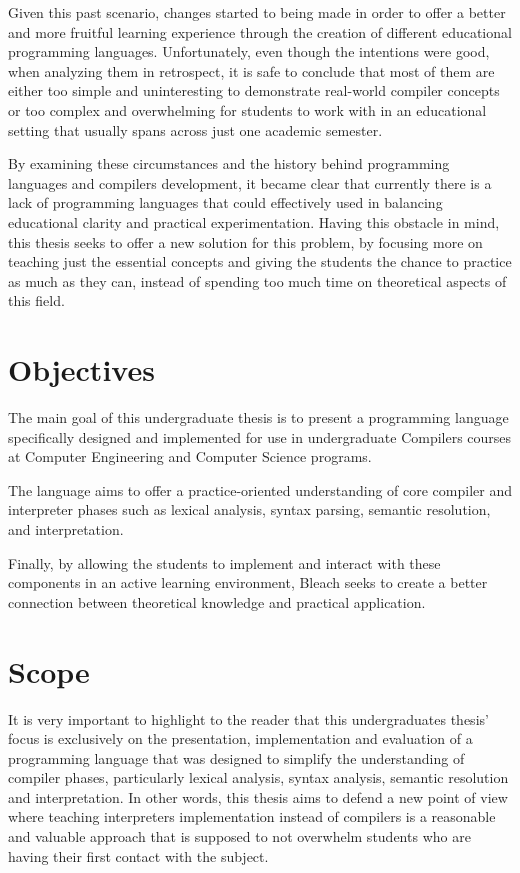 Given this past scenario, changes started to being made in order to offer a better and more fruitful learning experience through the creation of different educational programming languages. Unfortunately, even though the intentions were good, when analyzing them in retrospect, it is safe to conclude that most of them are either too simple and uninteresting to demonstrate real-world compiler concepts or too complex and overwhelming for students to work with in an educational setting that usually spans across just one academic semester.

By examining these circumstances and the history behind programming languages and compilers development, it became clear that currently there is a lack of programming languages that could effectively used in balancing educational clarity and practical experimentation. Having this obstacle in mind, this thesis seeks to offer a new solution for this problem, by focusing more on teaching just the essential concepts and giving the students the chance to practice as much as they can, instead of spending too much time on theoretical aspects of this field.

\section{Objectives}
The main goal of this undergraduate thesis is to present a programming language specifically designed and implemented for use in undergraduate Compilers courses at Computer Engineering and Computer Science programs.

The language aims to offer a practice-oriented understanding of core compiler and interpreter phases such as lexical analysis, syntax parsing, semantic resolution, and interpretation.

Finally, by allowing the students to implement and interact with these components in an active learning environment, Bleach seeks to create a better connection between theoretical knowledge and practical application.

\section{Scope}
It is very important to highlight to the reader that this undergraduates thesis' focus is exclusively on the presentation, implementation and evaluation of a programming language that was designed to simplify the understanding of compiler phases, particularly lexical analysis, syntax analysis, semantic resolution and interpretation. In other words, this thesis aims to defend a new point of view where teaching interpreters implementation instead of compilers is a reasonable and valuable approach that is supposed to not overwhelm students who are having their first contact with the subject. 

